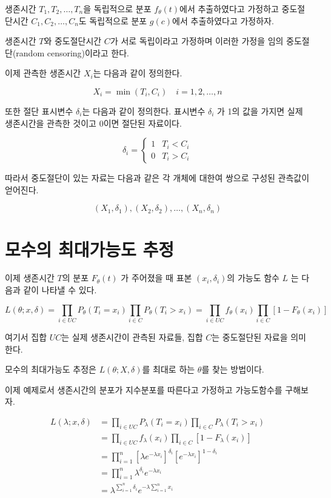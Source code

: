 \documentclass[
]{book}
\theoremstyle{definition}
\theoremstyle{definition}
\theoremstyle{definition}
\theoremstyle{definition}
\theoremstyle{remark}
\begin{document}
생존시간 \(T_1, T_2, \dots, T_n\)을 독립적으로 분포 \(f_\theta(t)\)에서 추출하였다고 가정하고 중도절단시간
\(C_1, C_2, \dots, C_n\)도 독립적으로 분포 \(g(c)\)에서 추출하였다고 가정하자.

생존시간 \(T\)와 중도절단시간 \(C\)가 서로 독립이라고 가정하며 이러한 가정을 임의 중도절단(random censoring)이라고 한다.

이제 관측한 생존시간 \(X_i\)는 다음과 같이 정의한다.

\[ X_i = \min (T_i, C_i) \quad i=1,2,\dots, n \]

또한 절단 표시변수 \(\delta_i\)는 다음과 같이 정의한다. 표시변수 \(\delta_i\) 가 1의 값을 가지면
실제 생존시간을 관측한 것이고 0이면 절단된 자료이다.

\[ \delta_i = \begin{cases}
1 & T_i < C_i \\
0 & T_i > C_i 
\end{cases} \]

따라서 중도절단이 있는 자료는 다음과 같은 각 개체에 대한여 쌍으로 구성된 관측값이 얻어진다.

\[ (X_1, \delta_1), (X_2, \delta_2), \dots, (X_n, \delta_n) \]

\hypertarget{uxbaa8uxc218uxc758-uxcd5cuxb300uxac00uxb2a5uxb3c4-uxcd94uxc815}{%
\section{모수의 최대가능도 추정}\label{uxbaa8uxc218uxc758-uxcd5cuxb300uxac00uxb2a5uxb3c4-uxcd94uxc815}}

이제 생존시간 \(T\)의 분포 \(F_\theta(t)\) 가 주어졌을 때 표본 \((x_i, \delta_i)\)의 가능도 함수 \(L\) 는 다음과 같이 나타낼 수 있다.

\[ L(\theta; x, \delta) = \prod_{i \in UC} P_\theta(T_i= x_i ) \prod_{i \in C} P_\theta(T_i > x_i ) = \prod_{i \in UC} f_\theta( x_i ) \prod_{i \in C} [1-F_\theta( x_i )] \]

여기서 집합 \(UC\)는 실제 생존시간이 관측된 자료들, 집합 \(C\)는 중도절단된 자료을 의미한다.

모수의 최대가능도 추정은 \(L(\theta; X, \delta)\)를 최대로 하는 \(\theta\)를 찾는 방법이다.

이제 예제로서 생존시간의 분포가 지수분포를 따른다고 가정하고 가능도함수를 구해보자.

\begin{align*}
L(\lambda; x, \delta) & = \prod_{i \in UC} P_\lambda(T_i= x_i ) \prod_{i \in C} P_\lambda(T_i > x_i ) \\
  & = \prod_{i \in UC} f_\lambda( x_i ) \prod_{i \in C} [1-F_\lambda( x_i )] \\
  & = \prod_{i=1}^n \left [ \lambda e^{-\lambda x_i} \right ]^{\delta_i} \left [e^{-\lambda x_i} \right ]^{1-\delta_i} \\
  & = \prod_{i=1}^n \lambda^{\delta_i} e^{-\lambda x_i} \\
  & = \lambda^{ \sum_{i=1}^n \delta_i} e^{-\lambda \sum_{i=1}^n x_i} 
\end{align*}
\end{document}
